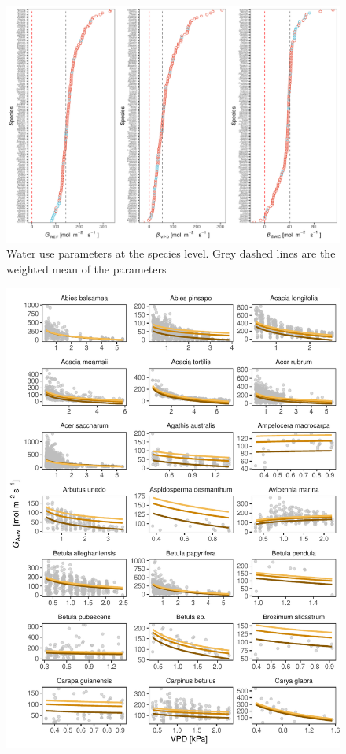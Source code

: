 \documentclass[11pt,twoside]{reedthesis}
\begin{document}
\begin{landscape}
\begin{figure}[H]

{\centering \includegraphics[width=0.9\linewidth]{figure/appendixD/fig17} 

}

\caption[Water use parameters at the species level.]{Water use parameters at the species level. Grey dashed lines are the weighted mean of the parameters}\label{fig:spparamplot}
\end{figure}

\end{landscape}
\begin{figure}[H]

{\centering \includegraphics[width=1\linewidth]{figure/appendixD/ggg1} 

}

\end{figure}
\end{document}
